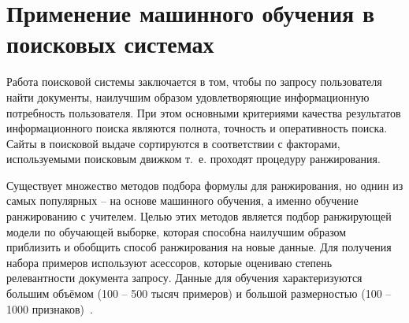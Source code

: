 \section{Применение машинного обучения в поисковых системах}

Работа поисковой системы заключается в том, чтобы по запросу пользователя найти документы, наилучшим образом удовлетворяющие информационную потребность пользователя. При этом основными критериями качества результатов информационного поиска являются полнота, точность и оперативность поиска. Сайты в поисковой выдаче сортируются в соответствии с факторами, используемыми поисковым движком т.~е. проходят процедуру ранжирования.

Существует множество методов подбора формулы для ранжирования, но однин из самых популярных -- на основе машинного обучения, а именно  обучение ранжированию с учителем. Целью этих методов является подбор ранжирующей модели по обучающей выборке, которая способна наилучшим образом приблизить и обобщить способ ранжирования на новые данные. Для получения набора примеров используют асессоров, которые оцениваю степень релевантности документа запросу. Данные для обучения характеризуются большим объёмом (100 -- 500 тысяч примеров) и большой размерностью (100 -- 1000 признаков)~\cite{ML_for_rank}.


